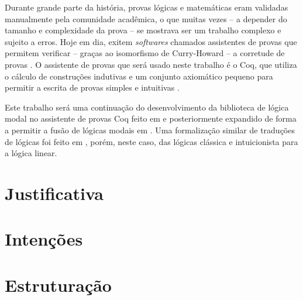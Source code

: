 Durante grande parte da história, provas lógicas e matemáticas eram validadas manualmente pela comunidade acadêmica, o que muitas vezes -- a depender do tamanho e complexidade da prova -- se mostrava ser um trabalho complexo e sujeito a erros. Hoje em dia, exitem \textit{softwares} chamados assistentes de provas que permitem verificar -- graças ao isomorfismo de Curry-Howard -- a corretude de provas \cite{Chlipala}. O assistente de provas que será usado neste trabalho é o Coq, que utiliza o cálculo de construções indutivas e um conjunto axiomático pequeno para permitir a escrita de provas simples e intuitivas \cite{Barras}.

Este trabalho será uma continuação do desenvolvimento da biblioteca de lógica modal no assistente de provas Coq feito em \cite{Silveira} e posteriormente expandido de forma a permitir a fusão de lógicas modais em \cite{Nunes}. Uma formalização similar de traduções de lógicas foi feito em \cite{Sehnem}, porém, neste caso, das lógicas clássica e intuicionista para a lógica linear.

    \section{Justificativa}
    \section{Intenções}
    \section{Estruturação}